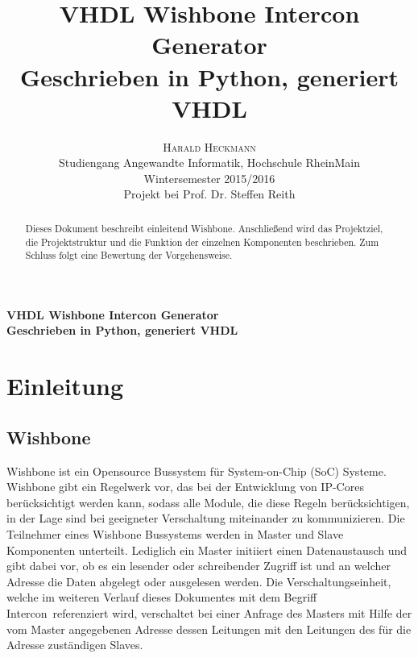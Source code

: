 \documentclass{article}
\title{\vspace{-3mm}%
	\fontsize{24pt}{10pt}\selectfont
	\textbf{VHDL Wishbone Intercon Generator} \\
	\textbf{Geschrieben in Python, generiert VHDL}
	}
\author{%
	\large
	\textsc{Harald Heckmann} \\[2mm]
	\normalsize	Studiengang Angewandte Informatik, Hochschule RheinMain \\
	\normalsize	Wintersemester 2015/2016 \\
	\normalsize	Projekt bei Prof. Dr. Steffen Reith \\
	\vspace{-5mm}
	}
\date{}
\begin{document}

\maketitle
\newpage




\begin{center}
\textbf{VHDL Wishbone Intercon Generator} \\
\textbf{Geschrieben in Python, generiert VHDL}
\end{center}

\begin{abstract}
Dieses Dokument beschreibt einleitend Wishbone. Anschließend wird das Projektziel, die Projektstruktur und die Funktion der einzelnen Komponenten beschrieben. Zum Schluss folgt eine Bewertung der Vorgehensweise.
\end{abstract}
\newpage
\tableofcontents
\newpage


\section{Einleitung}
\subsection{Wishbone}
Wishbone ist ein Opensource Bussystem für System-on-Chip (SoC) Systeme.
Wishbone gibt ein Regelwerk vor, das bei der Entwicklung von IP-Cores
berücksichtigt werden kann, sodass alle Module, die diese Regeln berücksichtigen,
in der Lage sind bei geeigneter Verschaltung miteinander zu kommunizieren.
Die Teilnehmer eines Wishbone Bussystems werden in Master und Slave Komponenten
unterteilt. Lediglich ein Master initiiert einen Datenaustausch und 
gibt dabei vor, ob es ein lesender oder schreibender Zugriff ist und an welcher Adresse
die Daten abgelegt oder ausgelesen werden.
Die Verschaltungseinheit, welche im weiteren Verlauf dieses Dokumentes mit dem Begriff \glqq Intercon\grqq\ referenziert wird, verschaltet bei einer Anfrage des Masters mit Hilfe der vom Master angegebenen Adresse 
dessen Leitungen mit den Leitungen des für die Adresse zuständigen Slaves.
\end{document}
